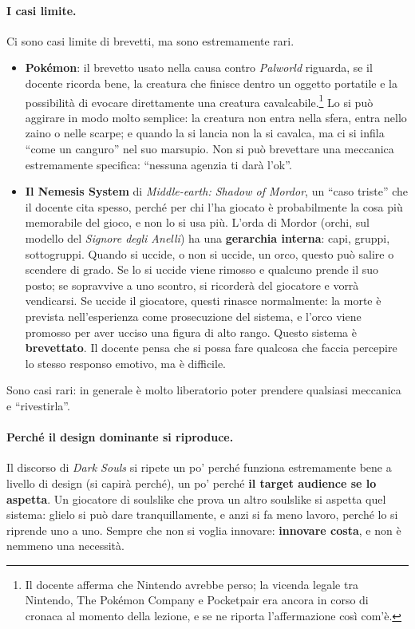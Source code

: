\paragraph{I casi limite.} Ci sono casi limite di brevetti, ma sono
estremamente rari.
\begin{itemize}
  \item \textbf{Pokémon}: il brevetto usato nella causa contro \emph{Palworld}
        riguarda, se il docente ricorda bene, la creatura che finisce dentro
        un oggetto portatile e la possibilità di evocare direttamente una
        creatura cavalcabile.\footnote{Il docente afferma che Nintendo avrebbe
        perso; la vicenda legale tra Nintendo, The Pokémon Company e
        Pocketpair era ancora in corso di cronaca al momento della lezione, e
        se ne riporta l'affermazione così com'è.} Lo si può aggirare in modo
        molto semplice: la creatura non entra nella sfera, entra nello zaino o
        nelle scarpe; e quando la si lancia non la si cavalca, ma ci si infila
        ``come un canguro'' nel suo marsupio. Non si può brevettare una
        meccanica estremamente specifica: ``nessuna agenzia ti darà l'ok''.
  \item \textbf{Il Nemesis System} di \emph{Middle-earth: Shadow of Mordor},
        un ``caso triste'' che il docente cita spesso, perché per chi l'ha
        giocato è probabilmente la cosa più memorabile del gioco, e non lo si
        usa più. L'orda di Mordor (orchi, sul modello del \emph{Signore degli
        Anelli}) ha una \textbf{gerarchia interna}: capi, gruppi, sottogruppi.
        Quando si uccide, o non si uccide, un orco, questo può salire o
        scendere di grado. Se lo si uccide viene rimosso e qualcuno prende il
        suo posto; se sopravvive a uno scontro, si ricorderà del giocatore e
        vorrà vendicarsi. Se uccide il giocatore, questi rinasce normalmente:
        la morte è prevista nell'esperienza come prosecuzione del sistema, e
        l'orco viene promosso per aver ucciso una figura di alto rango. Questo
        sistema è \textbf{brevettato}. Il docente pensa che si possa fare
        qualcosa che faccia percepire lo stesso responso emotivo, ma è
        difficile.
\end{itemize}
Sono casi rari: in generale è molto liberatorio poter prendere qualsiasi
meccanica e ``rivestirla''.

\paragraph{Perché il design dominante si riproduce.} Il discorso di
\emph{Dark Souls} si ripete un po' perché funziona estremamente bene a
livello di design (si capirà perché), un po' perché \textbf{il target audience
se lo aspetta}. Un giocatore di soulslike che prova un altro soulslike si
aspetta quel sistema: glielo si può dare tranquillamente, e anzi si fa meno
lavoro, perché lo si riprende uno a uno. Sempre che non si voglia innovare:
\textbf{innovare costa}, e non è nemmeno una necessità.

